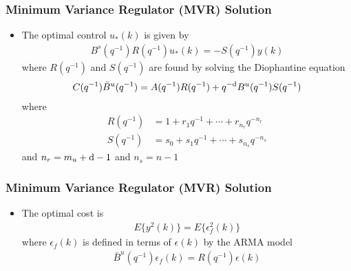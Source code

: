 \begin{frame}
    \frametitle{Minimum Variance Regulator (MVR) Solution}

    \begin{itemize}
        \item
        The optimal control $u_*(k)$ is given by
        \begin{align*}
            B^s(q^{-1}) R(q^{-1}) u_*(k) = - S(q^{-1}) y(k)
        \end{align*}
        where $R(q^{-1})$ and $S(q^{-1})$ are found by solving the Diophantine equation
        \begin{align*}
            C(q^{-1}) \bar{B}^u(q^{-1}) = A(q^{-1}) R(q^{-1}) + q^{-\textrm{d}} B^u(q^{-1}) S(q^{-1})
        \end{align*}
        where
        \begin{align*}
            R(q^{-1}) & = 1 + r_1 q^{-1} + \cdots + r_{n_r} q^{-n_r} \\
            S(q^{-1}) & = s_0 + s_1 q^{-1} + \cdots + s_{n_s} q^{-n_s}
        \end{align*}
        and $n_r = m_u + \textrm{d} - 1$ and $n_s = n-1$

    \end{itemize}
\end{frame}

\begin{frame}
    \frametitle{Minimum Variance Regulator (MVR) Solution}

    \begin{itemize}
        \item
        The optimal cost is 
        \begin{align*}
            E\{y^2(k)\} = E\{\epsilon_f^2(k)\} 
        \end{align*}
        where $\epsilon_f(k)$ is defined in terms of $\epsilon(k)$ by the ARMA model
        \begin{align*}
            \bar{B}^u(q^{-1}) \epsilon_f(k) = R(q^{-1}) \epsilon(k)
        \end{align*}
    \end{itemize}
\end{frame}

